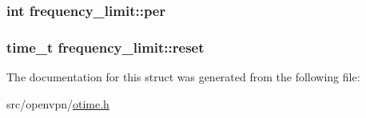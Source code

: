\subsubsection[{per}]{\setlength{\rightskip}{0pt plus 5cm}int frequency\+\_\+limit\+::per}\label{structfrequency__limit_a7803a1143f72bd05d48b1fc12b9ffeac}
\hypertarget{structfrequency__limit_a36d1935eca475d06125896694e28627c}{}
\subsubsection[{reset}]{\setlength{\rightskip}{0pt plus 5cm}time\+\_\+t frequency\+\_\+limit\+::reset}\label{structfrequency__limit_a36d1935eca475d06125896694e28627c}


The documentation for this struct was generated from the following file\+:\begin{DoxyCompactItemize}
\item 
src/openvpn/\hyperlink{otime_8h}{otime.\+h}\end{DoxyCompactItemize}
